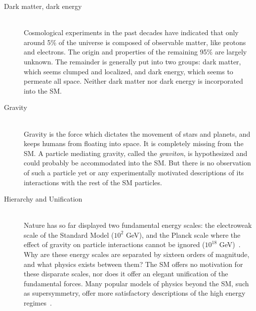 \begin{description}

    \item[Dark matter, dark energy] \hfill \\
      Cosmological experiments in the past decades have indicated that only around 5\% of the universe is composed of observable matter, like protons and electrons. The origin and properties of the remaining 95\% are largely unknown. The remainder is generally put into two groups: dark matter, which seems clumped and localized, and dark energy, which seems to permeate all space. Neither dark matter nor dark energy is incorporated into the SM.

    \item[Gravity] \hfill \\
      Gravity is the force which dictates the movement of stars and planets, and keeps humans from floating into space. It is completely missing from the SM. A particle mediating gravity, called the \textit{graviton}, is hypothesized and could probably be accommodated into the SM. But there is no observation of such a particle yet or any experimentally motivated descriptions of its interactions with the rest of the SM particles.

    \item[Hierarchy and Unification] \hfill \\
      Nature has so far displayed two fundamental energy scales: the electroweak scale of the Standard Model ($10^{2}$ GeV), and the Planck scale where the effect of gravity on particle interactions cannot be ignored ($10^{18}$ GeV)~\cite{1998.hierarchy}. Why are these energy scales are separated by sixteen orders of magnitude, and what physics exists between them? The SM offers no motivation for these disparate scales, nor does it offer an elegant unification of the fundamental forces. Many popular models of physics beyond the SM, such as supersymmetry, offer more satisfactory descriptions of the high energy regimes~\cite{1997.susyprimer}.

\end{description}

